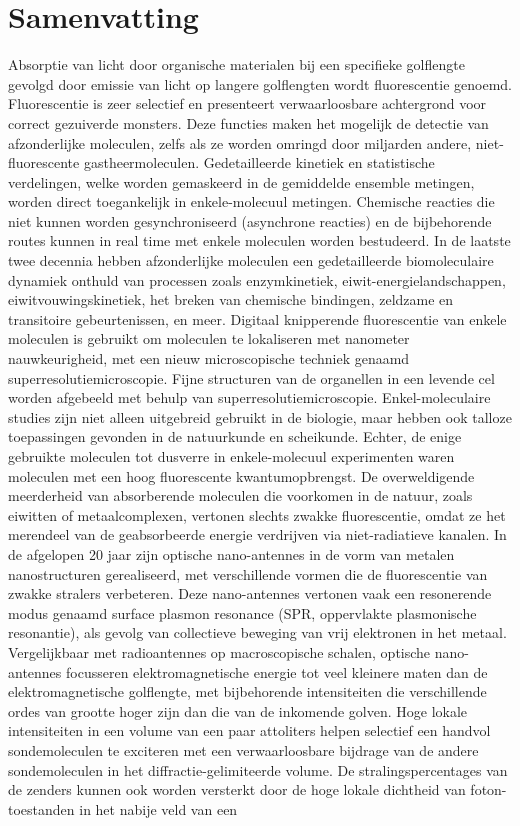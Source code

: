 \chapter*{Samenvatting}
\label{ch:Samenvatting}

Absorptie van licht door organische materialen bij een specifieke golflengte gevolgd door emissie
van licht op langere golflengten wordt fluorescentie genoemd. Fluorescentie is zeer selectief en
presenteert verwaarloosbare achtergrond voor correct gezuiverde monsters. Deze functies maken het mogelijk de detectie van afzonderlijke moleculen, zelfs als ze worden omringd door miljarden andere, niet-fluorescente gastheermoleculen. Gedetailleerde kinetiek en statistische verdelingen, welke worden gemaskeerd in de gemiddelde ensemble metingen, worden direct toegankelijk in enkele-molecuul metingen. Chemische reacties die niet kunnen worden gesynchroniseerd (asynchrone reacties) en de bijbehorende routes kunnen in real time met enkele moleculen worden bestudeerd. In de laatste twee decennia hebben afzonderlijke moleculen een gedetailleerde biomoleculaire dynamiek onthuld van processen zoals enzymkinetiek, eiwit-energielandschappen, eiwitvouwingskinetiek, het breken van chemische bindingen, zeldzame en transitoire gebeurtenissen, en meer. Digitaal knipperende fluorescentie van enkele moleculen is gebruikt om moleculen te lokaliseren met nanometer nauwkeurigheid, met een nieuw microscopische techniek genaamd superresolutiemicroscopie. Fijne structuren van de organellen in een levende cel worden afgebeeld met behulp van superresolutiemicroscopie. Enkel-moleculaire studies zijn niet alleen uitgebreid gebruikt in de biologie, maar hebben ook talloze toepassingen gevonden in de natuurkunde en scheikunde. Echter, de enige gebruikte moleculen tot dusverre in enkele-molecuul experimenten waren moleculen met een hoog fluorescente kwantumopbrengst. De overweldigende meerderheid van absorberende moleculen die voorkomen in de natuur, zoals eiwitten of metaalcomplexen, vertonen slechts zwakke fluorescentie, omdat ze het merendeel van de geabsorbeerde energie verdrijven via niet-radiatieve kanalen. In de afgelopen 20 jaar zijn optische nano-antennes in de vorm van metalen nanostructuren gerealiseerd, met verschillende vormen die de fluorescentie van zwakke stralers verbeteren. Deze nano-antennes vertonen vaak een resonerende modus genaamd surface plasmon resonance (SPR, oppervlakte plasmonische resonantie), als gevolg van collectieve beweging van vrij elektronen in het metaal. Vergelijkbaar met radioantennes op macroscopische schalen, optische nano-antennes focusseren elektromagnetische energie tot veel kleinere maten dan de elektromagnetische golflengte, met bijbehorende intensiteiten die verschillende ordes van grootte hoger zijn dan die van de inkomende golven. Hoge lokale intensiteiten in een volume van een paar attoliters helpen selectief een handvol sondemoleculen te exciteren met een verwaarloosbare bijdrage van de andere sondemoleculen in het diffractie-gelimiteerde volume. De stralingspercentages van de zenders kunnen ook worden versterkt door de hoge lokale dichtheid van foton-toestanden in het nabije veld van een 
